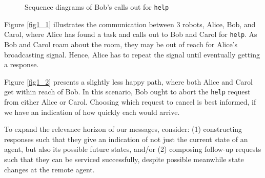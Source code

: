 \documentclass[conference]{IEEEtran}
\begin{document}
\begin{figure}
% 
% 
% 
% 
\caption{Sequence diagrams of Bob's calls out for
\label{fig1}
\texttt{help}}
\end{figure}

Figure \ref{fig1_1} illustrates the communication between 3 robots,
Alice, Bob, and Carol, where Alice has found a task and calls out to
Bob and Carol for \texttt{help}. As Bob and Carol roam about the room,
they may be out of reach for Alice's broadcasting signal. Hence, Alice
has to repeat the signal until eventually getting a response.
 
Figure \ref{fig1_2} presents a slightly less happy path, where both
Alice and Carol get within reach of Bob. In this scenario, Bob ought
to abort the \texttt{help} request from either Alice or Carol.
Choosing which request to cancel is best informed, if we have an
indication of how quickly each would arrive.

To expand the relevance horizon of our messages, consider: (1)
constructing responses such that they give an indication of not just
the current state of an agent, but also its possible future states,
and/or (2) composing follow-up requests such that they can be serviced
successfully, despite possible meanwhile state changes at the remote
agent.
\end{document}
